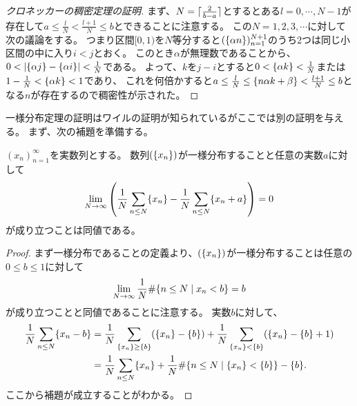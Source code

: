 \begin{proof}[クロネッカーの稠密定理の証明]
まず、$N = \lceil\frac{2}{b-a}\rceil$とするとある$l = 0, \cdots, N-1$が存在して$a \le \frac{l}{N} < \frac{l+1}{N} \le b$とできることに注意する。
この$N = 1, 2, 3, \cdots$に対して次の議論をする。
つまり区間$[0, 1)$を$N$等分すると$(\{\alpha n\})_{n = 1}^{N+1}$のうち$2$つは同じ小区間の中に入り$i < j$とおく。
このとき$\alpha$が無理数であることから、$0 < |\{\alpha j\}-\{\alpha i\}| < \frac{1}{N}$である。
よって、$k$を$j-i$とすると$0 < \{\alpha k\} < \frac{1}{N}$または$1-\frac{1}{N} < \{\alpha k\} < 1$であり、
これを何倍かすると$a \le \frac{l}{N} \le \{n\alpha k+\beta\} < \frac{l+1}{N} \le b$となる$n$が存在するので稠密性が示された。
\end{proof}

一様分布定理の証明はワイルの証明が知られているがここでは別の証明を与える。
まず、次の補題を準備する。

\begin{lemma}
$(x_n)_{n = 1}^\infty$を実数列とする。
数列$(\{x_n\})$が一様分布することと任意の実数$a$に対して
$$
\lim_{N \to \infty}\qty(\frac{1}{N}\sum_{n \le N}\{x_n\}-\frac{1}{N}\sum_{n \le N}\{x_n+a\}) = 0
$$
が成り立つことは同値である。
\end{lemma}

\begin{proof}
まず一様分布であることの定義より、$(\{x_n\})$が一様分布することは任意の$0 \le b \le 1$に対して
$$
\lim_{N \to \infty}\frac{1}{N}\#\{ n \le N \mid x_n < b \} = b
$$
が成り立つことと同値であることに注意する。
実数$b$に対して、
$$
\begin{aligned}
\frac{1}{N}\sum_{n \le N}\{x_n-b\}
&= \frac{1}{N}\sum_{\{x_n\} \ge \{b\}}(\{x_n\}-\{b\})+\frac{1}{N}\sum_{\{x_n\} < \{b\}}(\{x_n\}-\{b\}+1) \\
&= \frac{1}{N}\sum_{n \le N}\{x_n\}+\frac{1}{N}\#\{ n \le N \mid \{x_n\} < \{b\} \}-\{b\}.
\end{aligned}
$$
ここから補題が成立することがわかる。
\end{proof}

